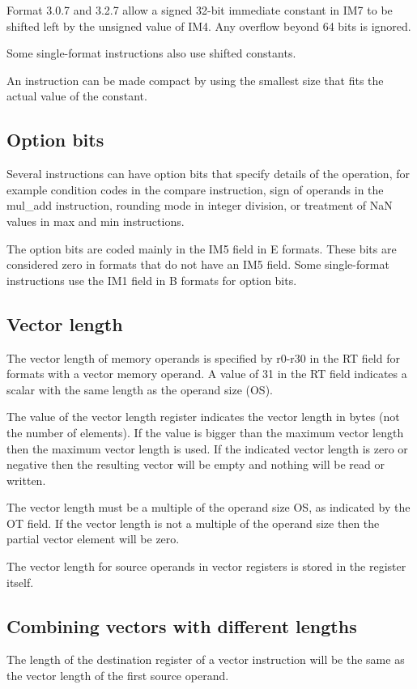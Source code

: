 \documentclass[forwardcom.tex]{subfiles}
\begin{document}
Format 3.0.7 and 3.2.7 allow a signed 32-bit immediate constant in IM7 to be shifted left by the unsigned value of IM4. 
Any overflow beyond 64 bits is ignored.
\vv

Some single-format instructions also use shifted constants.
\vv

An instruction can be made compact by using the smallest size that fits the actual value of the constant.
\vv

\subsection{Option bits}
Several instructions can have option bits that specify details of the operation, for example condition codes in the compare instruction, sign of operands in the mul\_add instruction, rounding mode in integer division, or treatment of NaN values in max and min instructions.
\vv

The option bits are coded mainly in the IM5 field in E formats. These bits are considered zero in formats that do not have an IM5 field. 
Some single-format instructions use the IM1 field in B formats for option bits. 
\vv

\subsection{Vector length}
The vector length of memory operands is specified by r0-r30 in the RT field for formats with a vector memory operand. A value of 31 in the RT field indicates a scalar with the same length as the operand size (OS).
\vv

The value of the vector length register indicates the vector length in bytes (not the number of elements). If the value is bigger than the maximum vector length then the maximum vector length is used. 
If the indicated vector length is zero or negative then the resulting vector will be empty and nothing will be read or written.
\vv

The vector length must be a multiple of the operand size OS, as indicated by the OT field. If the vector length is not a multiple of the operand size then the partial vector element will be zero.
\vv

The vector length for source operands in vector registers is stored in the register itself.
\vv

\subsection{Combining vectors with different lengths}
The length of the destination register of a vector instruction will be the same as the vector length of the first source operand.
\vv
\end{document}
